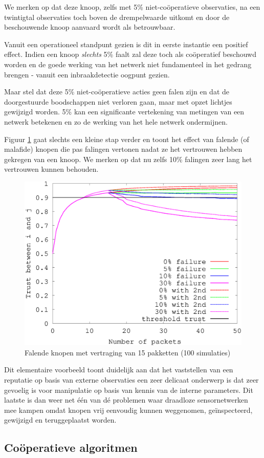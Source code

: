 We merken op dat deze knoop, zelfs met 5\% niet-co\"operatieve observaties, na
een twintigtal observaties toch boven de drempelwaarde uitkomt en door de
beschouwende knoop aanvaard wordt als betrouwbaar.

Vanuit een operationeel standpunt gezien is dit in eerste instantie een
positief effect. Indien een knoop \emph{slechts} 5\% faalt zal deze toch als
co\"operatief beschouwd worden en de goede werking van het netwerk niet
fundamenteel in het gedrang brengen - vanuit een inbraakdetectie oogpunt gezien.

Maar stel dat deze 5\% niet-co\"operatieve acties geen falen zijn en dat de
doorgestuurde boodschappen niet verloren gaan, maar met opzet lichtjes
gewijzigd worden. 5\% kan een significante vertekening van metingen van een
netwerk betekenen en zo de werking van het hele netwerk ondermijnen.

Figuur \ref{fig:reputation-malicious} gaat slechts een kleine stap verder en
toont het effect van falende (of malafide) knopen die pas falingen vertonen
nadat ze het vertrouwen hebben gekregen van een knoop. We merken op dat nu zelfs
10\% falingen zeer lang het vertrouwen kunnen behouden.

\begin{figure}[h]
 \centering
 \includegraphics[width=.5\linewidth]{./resources/reputation-malicious.eps}
 \caption{Falende knopen met vertraging van 15 pakketten (100 simulaties)}
 \label{fig:reputation-malicious}
\end{figure}

Dit elementaire voorbeeld toont duidelijk aan dat het vaststellen van een
reputatie op basis van externe observaties een zeer delicaat onderwerp is dat
zeer gevoelig is voor manipulatie op basis van kennis van de interne
parameters. Dit laatste is dan weer net \'e\'en van d\'e problemen waar
draadloze sensornetwerken mee kampen omdat knopen vrij eenvoudig kunnen
weggenomen, ge\"inspecteerd, gewijzigd en teruggeplaatst worden.

\subsection{Co\"operatieve algoritmen}


